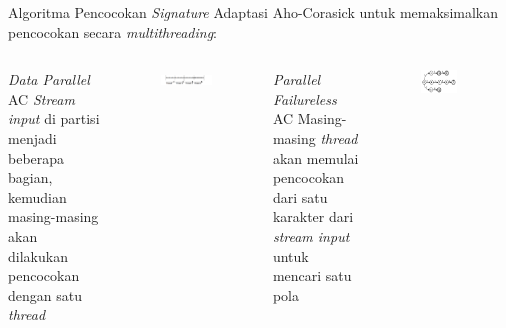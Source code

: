 \documentclass[10pt,xcolor=table]{beamer}
\begin{document}
\begin{frame}{Algoritma Pencocokan \emph{Signature}}
    Adaptasi Aho-Corasick untuk memaksimalkan pencocokan secara \emph{multithreading}:
    \begin{columns}[T,onlytextwidth]

            \begin{block}{\emph{Data Parallel} AC}
                \emph{Stream input} di partisi menjadi beberapa bagian, kemudian masing-masing akan dilakukan pencocokan dengan satu \emph{thread}
            \end{block}

            \begin{figure}
                \centering
                \includegraphics[width=1.0\textwidth]{../src/resources/boundary.png}
            \end{figure}
    
    
            \begin{block}{\emph{Parallel Failureless} AC}
                Masing-masing \emph{thread} akan memulai pencocokan dari satu karakter dari \emph{stream input} untuk mencari satu pola
            \end{block}
    
            \begin{figure}
                \centering
                \includegraphics[width=0.7\textwidth]{../src/resources/pfac.png}
            \end{figure}

    \end{columns}
\end{frame}
\end{document}
